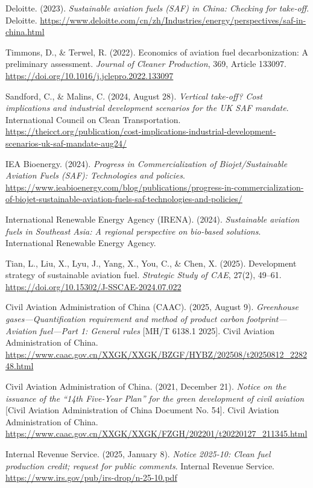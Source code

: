 \documentclass[a4paper,11pt]{article}
\begin{document}
\begin{thebibliography}{9}

Deloitte. (2023). \textit{Sustainable aviation fuels (SAF) in China: Checking for take-off}. Deloitte. 
\url{https://www.deloitte.com/cn/zh/Industries/energy/perspectives/saf-in-china.html}

Timmons, D., \& Terwel, R. (2022). Economics of aviation fuel decarbonization: A preliminary assessment. \textit{Journal of Cleaner Production}, 369, Article 133097. 
\url{https://doi.org/10.1016/j.jclepro.2022.133097}

Sandford, C., \& Malins, C. (2024, August 28). \textit{Vertical take-off? Cost implications and industrial development scenarios for the UK SAF mandate}. International Council on Clean Transportation. 
\url{https://theicct.org/publication/cost-implications-industrial-development-scenarios-uk-saf-mandate-aug24/}

IEA Bioenergy. (2024). \textit{Progress in Commercialization of Biojet/Sustainable Aviation Fuels (SAF): Technologies and policies}. 
\url{https://www.ieabioenergy.com/blog/publications/progress-in-commercialization-of-biojet-sustainable-aviation-fuels-saf-technologies-and-policies/}

International Renewable Energy Agency (IRENA). (2024). \textit{Sustainable aviation fuels in Southeast Asia: A regional perspective on bio-based solutions}. International Renewable Energy Agency.

Tian, L., Liu, X., Lyu, J., Yang, X., You, C., \& Chen, X. (2025). Development strategy of sustainable aviation fuel. \textit{Strategic Study of CAE}, 27(2), 49--61. 
\url{https://doi.org/10.15302/J-SSCAE-2024.07.022}

Civil Aviation Administration of China (CAAC). (2025, August 9). \textit{Greenhouse gases---Quantification requirement and method of product carbon footprint---Aviation fuel---Part 1: General rules} [MH/T 6138.1 2025]. Civil Aviation Administration of China. 
\url{https://www.caac.gov.cn/XXGK/XXGK/BZGF/HYBZ/202508/t20250812_228248.html}

Civil Aviation Administration of China. (2021, December 21). \textit{Notice on the issuance of the ``14th Five-Year Plan'' for the green development of civil aviation} [Civil Aviation Administration of China Document No. 54]. Civil Aviation Administration of China. 
\url{https://www.caac.gov.cn/XXGK/XXGK/FZGH/202201/t20220127_211345.html}

Internal Revenue Service. (2025, January 8). \textit{Notice 2025-10: Clean fuel production credit; request for public comments}. Internal Revenue Service. 
\url{https://www.irs.gov/pub/irs-drop/n-25-10.pdf}

\end{thebibliography}
\end{document}
